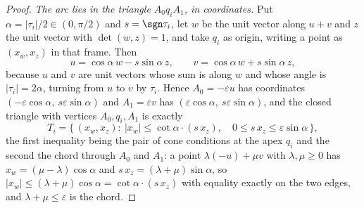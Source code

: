 \begin{proof}
\emph{The arc lies in the triangle $A_0q_iA_1$, in coordinates.} Put
$\alpha=|\tau_i|/2\in(0,\pi/2)$ and $s=\sgn\tau_i$, let $w$ be the unit vector
along $u+v$ and $z$ the unit vector with $\det(w,z)=1$, and take $q_i$ as
origin, writing a point as $(x_w,x_z)$ in that frame. Then
\[
   u=\cos\alpha\,w-s\sin\alpha\,z,
   \qquad
   v=\cos\alpha\,w+s\sin\alpha\,z,
\]
because $u$ and $v$ are unit vectors whose sum is along $w$ and whose angle is
$|\tau_i|=2\alpha$, turning from $u$ to $v$ by $\tau_i$. Hence
$A_0=-\varepsilon u$ has coordinates $(-\varepsilon\cos\alpha,\ s\varepsilon
\sin\alpha)$ and $A_1=\varepsilon v$ has $(\varepsilon\cos\alpha,\
s\varepsilon\sin\alpha)$, and the closed triangle with vertices $A_0,q_i,A_1$
is exactly
\begin{equation}
   T_i=\bigl\{\,(x_w,x_z):\ |x_w|\leq\cot\alpha\cdot(s\,x_z),
   \quad 0\leq s\,x_z\leq\varepsilon\sin\alpha\,\bigr\},
\label{CV:eq:triangle}
\end{equation}
the first inequality being the pair of cone conditions at the apex $q_i$ and the
second the chord through $A_0$ and $A_1$: a point $\lambda(-u)+\mu v$ with
$\lambda,\mu\geq0$ has $x_w=(\mu-\lambda)\cos\alpha$ and
$s\,x_z=(\lambda+\mu)\sin\alpha$, so $|x_w|\leq(\lambda+\mu)\cos\alpha=\cot\alpha
\cdot(s\,x_z)$ with equality exactly on the two edges, and $\lambda+\mu\leq
\varepsilon$ is the chord.


\end{proof}
